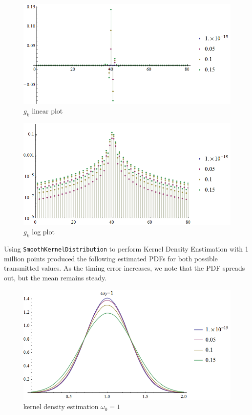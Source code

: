 \begin{figure}[htbp]
\centering
\includegraphics{../plots/fyp1_w1_gklin.png}
\caption{$g_k$ linear plot}
\end{figure}

\begin{figure}[htbp]
\centering
\includegraphics{../plots/fyp1_w1_gklog.png}
\caption{$g_k$ log plot}
\end{figure}

Using \texttt{SmoothKernelDistribution} to perform Kernel Density
Enstimation with 1 million points produced the following estimated PDFs
for both possible transmitted values. As the timing error increases, we
note that the PDF spreads out, but the mean remains steady.

\begin{figure}[htbp]
\centering
\includegraphics{../plots/fyp1_w1_kde.png}
\caption{kernel density estimation $\omega_0=1$}
\end{figure}

